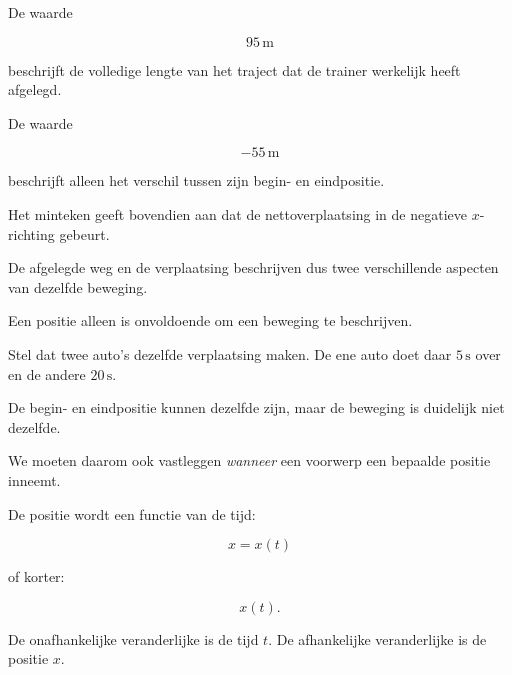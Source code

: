 \documentclass{ximera}
\begin{document}
\begin{oefening}{\oefU}
\begin{question}
  \begin{oplossing}
  De waarde
  
  \[
  95\,\mathrm{m}
  \]
  
  beschrijft de volledige lengte van het traject dat de trainer werkelijk heeft
  afgelegd.
  
  De waarde
  
  \[
  -55\,\mathrm{m}
  \]
  
  beschrijft alleen het verschil tussen zijn begin- en eindpositie.
  
  Het minteken geeft bovendien aan dat de nettoverplaatsing in de negatieve
  $x$-richting gebeurt.
  
  De afgelegde weg en de verplaatsing beschrijven dus twee verschillende
  aspecten van dezelfde beweging.
  \end{oplossing}
  \end{question}
  
  \end{oefening}

  




Een positie alleen is onvoldoende om een beweging te beschrijven.

Stel dat twee auto's dezelfde verplaatsing maken. De ene auto doet
daar $5\,\mathrm{s}$ over en de andere $20\,\mathrm{s}$.

De begin- en eindpositie kunnen dezelfde zijn, maar de beweging is
duidelijk niet dezelfde.

We moeten daarom ook vastleggen \emph{wanneer} een voorwerp een
bepaalde positie inneemt.

De positie wordt een functie van de tijd:

\[
\boxed{x=x(t)}
\]

of korter:

\[
\boxed{x(t)}.
\]

De onafhankelijke veranderlijke is de tijd $t$.
De afhankelijke veranderlijke is de positie $x$.



\end{document}

